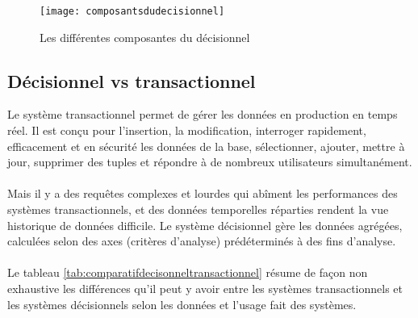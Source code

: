 \begin{figure}[H]
    \centering
    \texttt{[image: composantsdudecisionnel]}
    \caption{Les différentes composantes du décisionnel}
    \label{fig:composantsdudecisionnel}
\end{figure}

\subsection{Décisionnel vs transactionnel}
Le système transactionnel permet de gérer les données en production en temps réel. Il est conçu pour l’insertion, la modification, interroger rapidement, efficacement et en sécurité les données de la base, sélectionner, ajouter, mettre à jour, supprimer des tuples et répondre à de nombreux utilisateurs simultanément.
\paragraph{}
Mais il y a des requêtes complexes et lourdes qui abîment les performances des systèmes transactionnels, et des données temporelles réparties rendent la vue historique de données difficile. Le système décisionnel gère les données agrégées, calculées selon des axes (critères d’analyse) prédéterminés à des fins d’analyse.
\paragraph{}
Le tableau \ref{tab:comparatifdecisonneltransactionnel} résume de façon non exhaustive les différences qu’il peut y avoir entre les systèmes transactionnels et les systèmes décisionnels selon les données et l’usage fait des systèmes.

